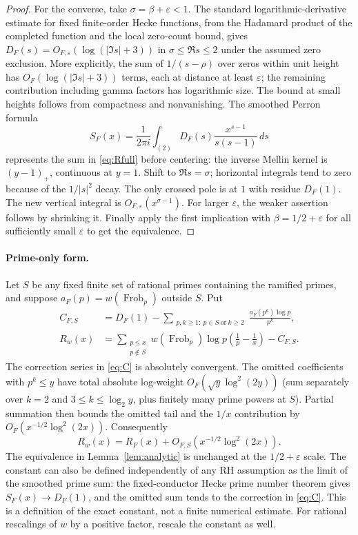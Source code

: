 \documentclass[11pt]{article}
\theoremstyle{remark}\newtheorem{remark}[theorem]{Remark}
\newcommand{\Frob}{\operatorname{Frob}}
\begin{document}
\begin{proof}
For the converse, take $\sigma=\beta+\varepsilon<1$. The standard logarithmic-derivative estimate for fixed finite-order Hecke functions, from the Hadamard product of the completed function and the local zero-count bound, gives $D_F(s)=O_{F,\varepsilon}(\log(|\Im s|+3))$ in $\sigma\le\Re s\le2$ under the assumed zero exclusion. More explicitly, the sum of $1/(s-\rho)$ over zeros within unit height has $O_F(\log(|\Im s|+3))$ terms, each at distance at least $\varepsilon$; the remaining contribution including gamma factors has logarithmic size. The bound at small heights follows from compactness and nonvanishing. The smoothed Perron formula
\[
 S_F(x)=\frac1{2\pi i}\int_{(2)}D_F(s)\frac{x^{s-1}}{s(s-1)}\,ds
\]
represents the sum in \eqref{eq:Rfull} before centering: the inverse Mellin kernel is $(y-1)_+$, continuous at $y=1$. Shift to $\Re s=\sigma$; horizontal integrals tend to zero because of the $1/|s|^2$ decay. The only crossed pole is at $1$ with residue $D_F(1)$. The new vertical integral is $O_{F,\varepsilon}(x^{\sigma-1})$. For larger $\varepsilon$, the weaker assertion follows by shrinking it. Finally apply the first implication with $\beta=1/2+\varepsilon$ for all sufficiently small $\varepsilon$ to get the equivalence.
\end{proof}

\paragraph{Prime-only form.} Let $S$ be any fixed finite set of rational primes containing the ramified primes, and suppose $a_F(p)=w(\Frob_p)$ outside $S$. Put
\begin{align}
 C_{F,S}&=D_F(1)-\sum_{\substack{p,k\ge1:\ p\in S\ \text{or}\ k\ge2}}\frac{a_F(p^k)\log p}{p^k},\label{eq:C}\\
 R_w(x)&=\sum_{\substack{p\le x\\p\notin S}}w(\Frob_p)\log p\left(\frac1p-\frac1x\right)-C_{F,S}.
 \label{eq:Rprime}
\end{align}
The correction series in \eqref{eq:C} is absolutely convergent. The omitted coefficients with $p^k\le y$ have total absolute log-weight $O_F(\sqrt y\log^2(2y))$ (sum separately over $k=2$ and $3\le k\le \log_2 y$, plus finitely many prime powers at $S$). Partial summation then bounds the omitted tail and the $1/x$ contribution by $O_F(x^{-1/2}\log^2(2x))$. Consequently
\begin{equation}\label{eq:correction}
 R_w(x)=R_F(x)+O_{F,S}(x^{-1/2}\log^2(2x)).
\end{equation}
The equivalence in Lemma~\ref{lem:analytic} is unchanged at the $1/2+\varepsilon$ scale. The constant can also be defined independently of any RH assumption as the limit of the smoothed prime sum: the fixed-conductor Hecke prime number theorem gives $S_F(x)\to D_F(1)$, and the omitted sum tends to the correction in \eqref{eq:C}. This is a definition of the exact constant, not a finite numerical estimate. For rational rescalings of $w$ by a positive factor, rescale the constant as well.
\end{document}
